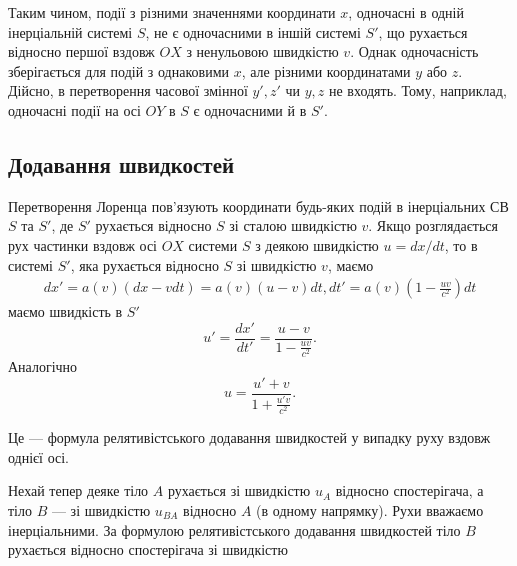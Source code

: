 Таким чином, події з різними значеннями координати $x$, одночасні в одній інерціальній системі $S$, не є одночасними в
іншій системі $S'$, що рухається відносно першої вздовж $OX$ з ненульовою швидкістю $v$. Однак одночасність зберігається
для подій з однаковими $x$, але різними координатами $y$ або $z$. Дійсно, в перетворення часової змінної $y',z'$ чи
$y,z$ не входять. Тому, наприклад, одночасні події на осі $OY$ в $S$ є одночасними й в $S'$.

\subsection*{Додавання швидкостей}
\label{sec:velocity_addition_low}

Перетворення Лоренца пов'язують координати будь-яких подій в інерціальних СВ $S$ та $S'$, де $S'$ рухається відносно $S$
зі сталою швидкістю $v$. Якщо розглядається рух частинки вздовж осі $OX$ системи $S$ з деякою швидкістю $u=dx/dt$, то в
системі $S'$, яка рухається відносно $S$ зі швидкістю $v$, маємо
\begin{align*}
    dx'=a(v)(dx-vdt)=a(v)(u-v)dt,
    dt'=a(v)\left(1-\frac{uv}{c^2}\right)dt
\end{align*}
%
маємо швидкість в $S'$
\begin{equation*}
    u'=\frac{dx'}{dt'}=\frac{u-v}{1-\frac{uv}{c^2}}.
\end{equation*}
	Аналогічно
\begin{equation*}
    u=\frac{u'+v}{1+\frac{u'v}{c^2}}.
\end{equation*}

Це --- формула релятивістського додавання швидкостей у випадку руху вздовж однієї осі.

Нехай тепер деяке тіло $A$ рухається зі швидкістю $u_A$ відносно спостерігача, а тіло $B$ --- зі швидкістю $u_{BA}$
відносно $A$ (в одному напрямку). Рухи вважаємо інерціальними. За формулою релятивістського додавання швидкостей тіло
$B$ рухається відносно спостерігача зі швидкістю

